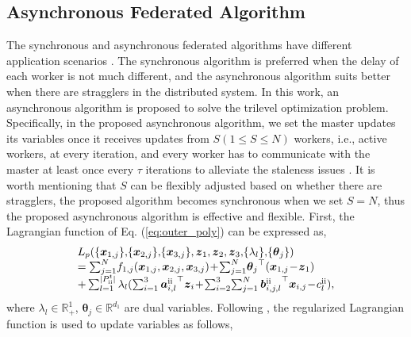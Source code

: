 \documentclass[letterpaper]{article} %
\begin{document}
\subsection{Asynchronous Federated Algorithm}
The synchronous and asynchronous federated algorithms have different application scenarios \cite{su2022gba}. The synchronous algorithm is preferred when the delay of each worker is not much different, and the asynchronous algorithm suits better when there are stragglers in the distributed system. In this work, an asynchronous algorithm is proposed to solve the trilevel optimization problem. Specifically, in the proposed asynchronous algorithm, we set the master
updates its variables once it receives updates from $S (1\le S \le N)$ workers, i.e., active workers, at every iteration, and every
worker has to communicate with the master at least once every $\tau$ iterations to alleviate the staleness issues \cite{zhang2014asynchronous}. It is worth mentioning that $S$ can be flexibly adjusted based on whether there are stragglers, the proposed algorithm becomes synchronous when we set $S=N$, thus the proposed asynchronous algorithm is effective and flexible. First, the Lagrangian function of Eq. (\ref{eq:outer_poly}) can be expressed as,
\begin{equation}
\begin{array}{l}
L_p(\{{\boldsymbol{x}_{1,j}}\} ,\!\{{\boldsymbol{x}_{2,j}}\} ,\!\{{\boldsymbol{x}_{3,j}}\} ,{\boldsymbol{z}_1},{\boldsymbol{z}_2},{\boldsymbol{z}_3},\! \{\lambda_l\}, \!\{\boldsymbol{\theta}_j\} ) \\

= \sum\nolimits_{j = 1}^N \! {{f_{1,j}}({\boldsymbol{x}_{1,j}},{\boldsymbol{x}_{2,j}},{\boldsymbol{x}_{3,j}})} \! +\! \sum\nolimits_{j = 1}^N \!{{\boldsymbol{\theta}_j}}^{\top} ({\boldsymbol{x}_{1,j}}\! -\! {\boldsymbol{z}_1})\\

 + \sum\nolimits_{l = 1}^{|P_{{\rm{\uppercase\expandafter{\romannumeral2}}}}^{t}|} {{\lambda _l}} ({\sum\nolimits_{i = 1}^3 {\boldsymbol{a}_{i,l}^{{\rm{\uppercase\expandafter{\romannumeral2}}}}} ^{\top}}{\boldsymbol{z}_i} \!+\! \sum\nolimits_{i = 2}^3 \! {\sum\nolimits_{j = 1}^N {\boldsymbol{b}{{_{i,j,l}^{{\rm{\uppercase\expandafter{\romannumeral2}}}}}^{\top}}{\boldsymbol{x}_{i,j}}} } \! -\! c_l^{{\rm{\uppercase\expandafter{\romannumeral2}}}}),
\end{array}
\end{equation}
where $\lambda _l\!\in\!\mathbb{R}^1_{+}$, $\boldsymbol{\theta}_j\!\in\!\mathbb{R}^{d_1}$ are dual variables. Following \cite{xu2020unified,jiao2022asynchronous}, the regularized Lagrangian function is used to update variables as follows,
\end{document}
